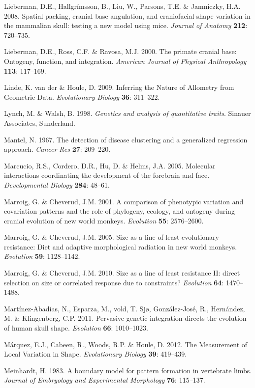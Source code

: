 \documentclass[12pt,]{article}
\begin{document}
Lieberman, D.E., Hallgrímsson, B., Liu, W., Parsons, T.E. \& Jamniczky,
H.A. 2008. Spatial packing, cranial base angulation, and craniofacial
shape variation in the mammalian skull: testing a new model using mice.
\emph{Journal of Anatomy} \textbf{212}: 720--735.

Lieberman, D.E., Ross, C.F. \& Ravosa, M.J. 2000. The primate cranial
base: Ontogeny, function, and integration. \emph{American Journal of
Physical Anthropology} \textbf{113}: 117--169.

Linde, K. van der \& Houle, D. 2009. Inferring the Nature of Allometry
from Geometric Data. \emph{Evolutionary Biology} \textbf{36}: 311--322.

Lynch, M. \& Walsh, B. 1998. \emph{Genetics and analysis of quantitative
traits}. Sinauer Associates, Sunderland.

Mantel, N. 1967. The detection of disease clustering and a generalized
regression approach. \emph{Cancer Res} \textbf{27}: 209--220.

Marcucio, R.S., Cordero, D.R., Hu, D. \& Helms, J.A. 2005. Molecular
interactions coordinating the development of the forebrain and face.
\emph{Developmental Biology} \textbf{284}: 48--61.

Marroig, G. \& Cheverud, J.M. 2001. A comparison of phenotypic variation
and covariation patterns and the role of phylogeny, ecology, and
ontogeny during cranial evolution of new world monkeys. \emph{Evolution}
\textbf{55}: 2576--2600.

Marroig, G. \& Cheverud, J.M. 2005. Size as a line of least evolutionary
resistance: Diet and adaptive morphological radiation in new world
monkeys. \emph{Evolution} \textbf{59}: 1128--1142.

Marroig, G. \& Cheverud, J.M. 2010. Size as a line of least resistance
II: direct selection on size or correlated response due to constraints?
\emph{Evolution} \textbf{64}: 1470--1488.

Martínez-Abadías, N., Esparza, M., vold, T. Sjø, González-José, R.,
Hernández, M. \& Klingenberg, C.P. 2011. Pervasive genetic integration
directs the evolution of human skull shape. \emph{Evolution}
\textbf{66}: 1010--1023.

Márquez, E.J., Cabeen, R., Woods, R.P. \& Houle, D. 2012. The
Measurement of Local Variation in Shape. \emph{Evolutionary Biology}
\textbf{39}: 419--439.

Meinhardt, H. 1983. A boundary model for pattern formation in vertebrate
limbs. \emph{Journal of Embryology and Experimental Morphology}
\textbf{76}: 115--137.
\end{document}
